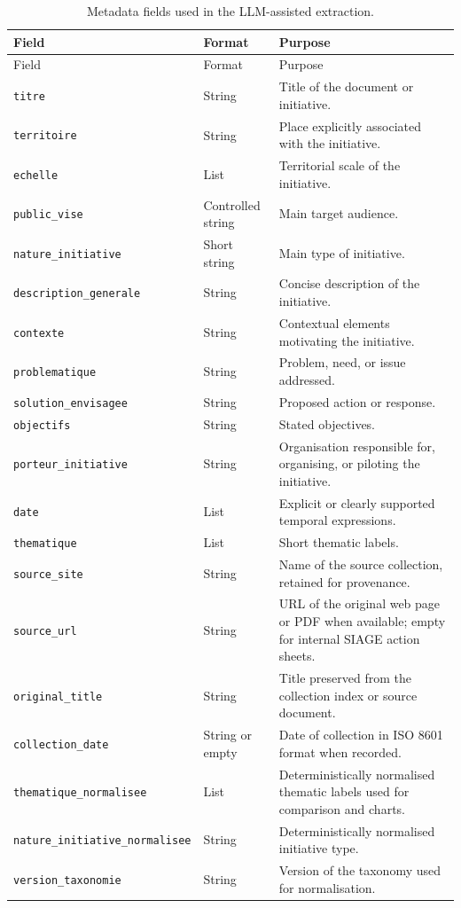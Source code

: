 \documentclass[
11pt,
english,
singlespacing,
headsepline,
]{MastersDoctoralThesis}
\begin{document}
\begin{longtable}{p{3.3cm}p{2.5cm}p{8cm}}
\caption{Metadata fields used in the LLM-assisted extraction.}
\label{tab:appendix-schema}\\
\toprule
Field & Format & Purpose \\
\midrule
\endfirsthead
\toprule
Field & Format & Purpose \\
\midrule
\endhead
\bottomrule
\endfoot
\texttt{titre} & String & Title of the document or initiative. \\
\texttt{territoire} & String & Place explicitly associated with the initiative. \\
\texttt{echelle} & List & Territorial scale of the initiative. \\
\texttt{public\_vise} & Controlled string & Main target audience. \\
\texttt{nature\_initiative} & Short string & Main type of initiative. \\
\texttt{description\_generale} & String & Concise description of the initiative. \\
\texttt{contexte} & String & Contextual elements motivating the initiative. \\
\texttt{problematique} & String & Problem, need, or issue addressed. \\
\texttt{solution\_envisagee} & String & Proposed action or response. \\
\texttt{objectifs} & String & Stated objectives. \\
\texttt{porteur\_initiative} & String & Organisation responsible for, organising, or piloting the initiative. \\
\texttt{date} & List & Explicit or clearly supported temporal expressions. \\
\texttt{thematique} & List & Short thematic labels. \\
\texttt{source\_site} & String & Name of the source collection, retained for provenance. \\
\texttt{source\_url} & String & URL of the original web page or PDF when available; empty for internal SIAGE action sheets. \\
\texttt{original\_title} & String & Title preserved from the collection index or source document. \\
\texttt{collection\_date} & String or empty & Date of collection in ISO 8601 format when recorded. \\
\texttt{thematique\_normalisee} & List & Deterministically normalised thematic labels used for comparison and charts. \\
\texttt{nature\_initiative\_normalisee} & String & Deterministically normalised initiative type. \\
\texttt{version\_taxonomie} & String & Version of the taxonomy used for normalisation. \\
\end{longtable}
\end{document}
